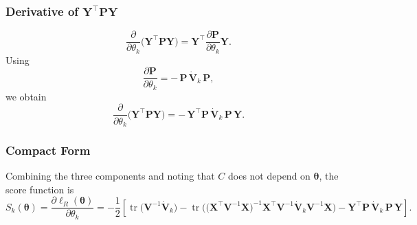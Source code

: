 \documentclass[
  letterpaper,
  DIV=11,
  numbers=noendperiod]{scrartcl}
\begin{document}
\subsubsection{\texorpdfstring{Derivative of
\(\symbf{Y}^\top \symbf{P}\symbf{Y}\)}{Derivative of \textbackslash symbf\{Y\}\^{}\textbackslash top \textbackslash symbf\{P\}\textbackslash symbf\{Y\}}}\label{derivative-of-symbfytop-symbfpsymbfy}

\begin{equation}
\frac{\partial}{\partial \theta_k}
\big(\symbf{Y}^\top \symbf{P}\symbf{Y}\big)
=
\symbf{Y}^\top
\frac{\partial \symbf{P}}{\partial \theta_k}
\symbf{Y}.
\end{equation} Using \begin{equation}
\frac{\partial \symbf{P}}{\partial \theta_k}
=
-\,\symbf{P}\,\dot{\symbf{V}}_k\,\symbf{P},
\end{equation} we obtain \begin{equation}
\frac{\partial}{\partial \theta_k}
\big(\symbf{Y}^\top \symbf{P}\symbf{Y}\big)
=
-\,\symbf{Y}^\top \symbf{P}\,\dot{\symbf{V}}_k\,\symbf{P}\,\symbf{Y}.
\end{equation}

\subsubsection{Compact Form}\label{compact-form}

Combining the three components and noting that \(C\) does not depend on
\(\symbf{\theta}\), the score function is \begin{equation}
S_k(\symbf{\theta})
=
\frac{\partial \ell_R(\symbf{\theta})}{\partial \theta_k}
=
-\frac{1}{2}
\left[
\operatorname{tr}\!\big(\symbf{V}^{-1}\dot{\symbf{V}}_k\big)
-
\operatorname{tr}\!\Big(
\big(\symbf{X}^\top \symbf{V}^{-1}\symbf{X}\big)^{-1}
\symbf{X}^\top \symbf{V}^{-1}
\dot{\symbf{V}}_k
\symbf{V}^{-1}\symbf{X}
\Big)
-
\symbf{Y}^\top \symbf{P}\,\dot{\symbf{V}}_k\,\symbf{P}\,\symbf{Y}
\right].
\end{equation}
\end{document}
